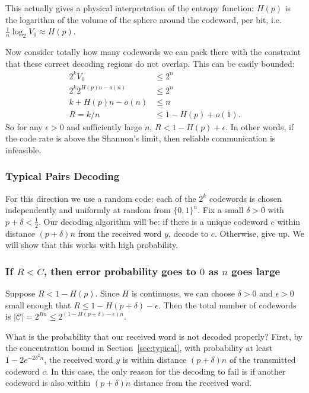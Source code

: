 This actually gives a physical interpretation of the entropy function: \(H(p)\) is the logarithm of the volume of the sphere around the codeword, per bit, i.e. \(\frac{1}{n}\log_2 V_0 \approx H(p)\).  

Now consider totally how many codewords we can pack there with the constraint that these correct decoding regions do not overlap. This can be easily bounded: 
\begin{align*}
2^k V_0 &\leq 2^n \\
2^k 2^{H(p)n -o(n)} &\leq 2^n \\
k + H(p) n - o(n) &\leq n \\
R = k/n &\leq 1-H(p) + o(1). 
\end{align*}
So for any \(\epsilon > 0\) and sufficiently large \(n\), \(R < 1 - H(p) + \epsilon\). In other words, if the code rate is above the Shannon's limit, then reliable communication is infeasible. 

\subsubsection{Typical Pairs Decoding}
For this direction we use a random code: each of the \(2^k\) codewords is chosen independently and uniformly at random from \(\{0,1\}^n\). Fix a small \(\delta > 0\) with \(p + \delta < \frac{1}{2}\).
Our decoding algorithm will be: if there is a unique codeword \(c\) within distance \((p + \delta)n\) from
the received word \(y\), decode to \(c\). Otherwise, give up. We will show that this works with high
probability.

\subsubsection{If \(R < C\), then error probability goes to \(0\) as \(n\) goes large}

Suppose \(R < 1 - H(p)\). Since \(H\) is continuous, we can choose \(\delta > 0\) and \(\epsilon > 0\) small enough that \(R \leq 1 - H(p+\delta) - \epsilon\). Then the total number of codewords is \(|\mathcal{C}| = 2^{Rn} \leq 2^{(1-H(p+\delta)-\epsilon)n}.\)

What is the probability that our received word is not decoded properly? First, by the concentration bound in Section~\ref{sec:typical}, with probability at least \(1 - 2e^{-2\delta^2 n}\), the received word \(y\) is within distance \((p + \delta)n\) of the transmitted codeword \(c\). In this case, the only reason
for the decoding to fail is if another codeword is also within \((p + \delta)n\) distance from the received
word. 

